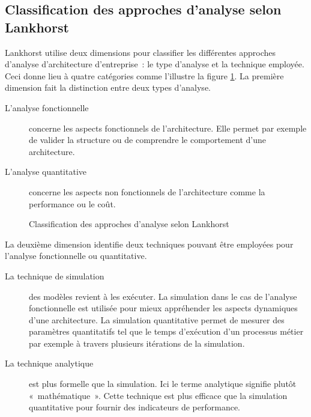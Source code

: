 \subsection{Classification des approches d'analyse selon Lankhorst}

Lankhorst \cite{lankhorst2013enterprise} utilise deux dimensions pour classifier les différentes approches d'analyse d'architecture d'entreprise~: le type d'analyse et la technique employée. Ceci donne lieu à quatre catégories comme l'illustre la
figure \ref{fig:classLankhorst}. La première dimension fait la distinction
entre deux types d'analyse.

\begin{description}
    \item[L'analyse fonctionnelle] concerne les aspects fonctionnels de
    l'architecture. Elle permet par exemple de valider la structure ou de
    comprendre le comportement d'une architecture.

    \item[L'analyse quantitative] concerne les aspects non fonctionnels de
    l'architecture comme la performance ou le coût.
\end{description}

\begin{figure}[!ht]
    \begin{center}
        
    \end{center}
    \caption{Classification des approches d'analyse selon Lankhorst 
    \protect\cite{lankhorst2013enterprise}}
    \label{fig:classLankhorst}
\end{figure}

La deuxième dimension identifie deux techniques pouvant être employées pour 
l'analyse fonctionnelle ou quantitative.

\begin{description}

    \item[La technique de simulation] des modèles revient à les exécuter. La simulation 	dans le cas de l'analyse fonctionnelle est utilisée
    pour mieux appréhender les aspects dynamiques d'une architecture. La
    simulation quantitative permet de mesurer des paramètres quantitatifs tel
    que le temps d'exécution d'un processus métier par exemple à travers
    plusieurs itérations de la simulation. 

    \item[La technique analytique] est plus formelle que la simulation.  Ici le
    terme analytique signifie plutôt «~mathématique~». Cette technique est plus
    efficace que la simulation quantitative pour fournir des indicateurs de
    performance. 

\end{description}

